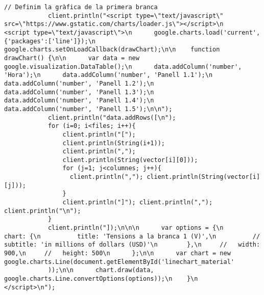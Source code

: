 \begin{lstlisting}[style=myArduino]
            // Definim la gràfica de la primera branca
            client.println("<script type=\"text/javascript\" src=\"https://www.gstatic.com/charts/loader.js\"></script>\n    <script type=\"text/javascript\">\n      google.charts.load('current', {'packages':['line']});\n      google.charts.setOnLoadCallback(drawChart);\n\n    function drawChart() {\n\n      var data = new google.visualization.DataTable();\n      data.addColumn('number', 'Hora');\n      data.addColumn('number', 'Panell 1.1');\n      data.addColumn('number', 'Panell 1.2');\n      data.addColumn('number', 'Panell 1.3');\n      data.addColumn('number', 'Panell 1.4');\n      data.addColumn('number', 'Panell 1.5');\n\n");
            client.println("data.addRows([\n");
            for (i=0; i<files; i++){
                client.println("[");
                client.println(String(i+1)); 
                client.println(",");
                client.println(String(vector[i][0]));
                for (j=1; j<columnes; j++){
                  client.println(","); client.println(String(vector[i][j]));
                }  
                client.println("]"); client.println(","); client.println("\n");
            }
            client.println("]);\n\n\n      var options = {\n        chart: {\n          title: 'Tensions a la branca 1 (V)',\n          // subtitle: 'in millions of dollars (USD)'\n        },\n     //   width: 900,\n     //   height: 500\n      };\n\n      var chart = new google.charts.Line(document.getElementById('linechart_material'
            ));\n\n      chart.draw(data, google.charts.Line.convertOptions(options));\n    }\n    </script>\n");


\end{lstlisting}
